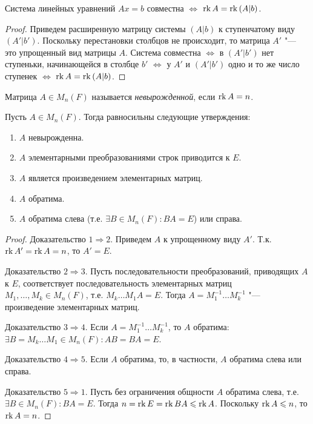 \begin{theorem}
	Система линейных уравнений $Ax = b$ совместна $\Leftrightarrow$ $\operatorname{rk}{A} = \operatorname{rk}{(A|b)}$.
\end{theorem}

\begin{proof}
	Приведем расширенную матрицу системы $(A|b)$ к ступенчатому виду $(A'|b')$. Поскольку перестановки столбцов не происходит, то матрица $A'$ "--- это упрощенный вид матрицы $A$. Система совместна $\Leftrightarrow$ в $(A'|b')$ нет ступеньки, начинающейся в столбце $b'$ $\Leftrightarrow$ у $A'$ и $(A'|b')$ одно и то же число ступенек $\Leftrightarrow$ $\operatorname{rk}{A} = \operatorname{rk}{(A|b)}$.
\end{proof}

\begin{definition}
	Матрица $A \in M_{n}(F)$ называется \textit{невырожденной}, если $\operatorname{rk}{A} = n$.
\end{definition}

\begin{theorem}
	Пусть $A \in M_{n}(F)$. Тогда равносильны следующие утверждения:
	\begin{enumerate}
		\item $A$ невырожденна.
		\item $A$ элементарными преобразованиями строк приводится к $E$.
		\item $A$ является произведением элементарных матриц.
		\item $A$ обратима.
		\item $A$ обратима слева (т.\:е. $\exists B \in M_n(F): BA = E$) или справа.
	\end{enumerate}
\end{theorem}

\begin{proof}
	Доказательство $1 \Rightarrow 2$. Приведем $A$ к упрощенному виду $A'$. Т.\:к. $\operatorname{rk}{A'} = \operatorname{rk}{A} = n$, то $A' = E$.
	
	Доказательство $2 \Rightarrow 3$. Пусть последовательности преобразований, приводящих $A$ к $E$, соответствует последовательность элементарных матриц $M_1, \dots, M_{k} \in M_n(F)$, т.\:е. $M_k\dots M_1A = E$. Тогда $A = M_1^{-1}\dots M_k^{-1}$ "--- произведение элементарных матриц.
	
	Доказательство $3 \Rightarrow 4$. Если $A = M_1^{-1}\dots M_k^{-1}$, то $A$ обратима: $\exists B = M_k\dots M_1 \in M_n(F) : AB = BA = E$.
	
	Доказательство $4 \Rightarrow 5$. Если $A$ обратима, то, в частности, $A$ обратима слева или справа.
	
	Доказательство $5 \Rightarrow 1$. Пусть без ограничения общности $A$ обратима слева, т.\:е. $\exists B \in M_n(F): BA = E$. Тогда $n = \rk{E} = \rk{BA} \hm{\le} \rk{A}$. Поскольку $\operatorname{rk}{A} \leqslant n$, то $\operatorname{rk}{A} = n$.
\end{proof}

